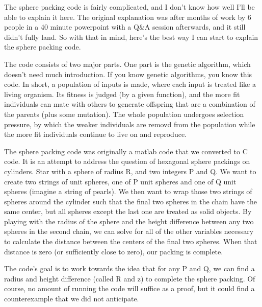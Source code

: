 The sphere packing code is fairly complicated, and I don't know how well I'll be able to explain it here. The original explanation was after months of work by 6 people in a 40 minute powerpoint with a Q\&A session afterwards, and it still didn't fully land. So with that in mind, here's the best way I can start to explain the sphere packing code.

The code consists of two major parts. One part is the genetic algorithm, which doesn't need much introduction. If you know genetic algorithms, you know this code. In short, a population of inputs is made, where each input is treated like a living organism. Its fitness is judged (by a given function), and the more fit individuals can mate with others to generate offspring that are a combination of the parents (plus some mutation). The whole population undergoes selection pressure, by which the weaker individuals are removd from the population while the more fit individuals continue to live on and reproduce.

The sphere packing code was originally a matlab code that we converted to C code. It is an attempt to address the question of hexagonal sphere packings on cylinders.
Star with a sphere of radius R, and two integers P and Q. We want to create two strings of unit spheres, one of P unit spheres and one of Q unit spheres (imagine a string of pearls). We then want to wrap those two strings of spheres around the cylinder such that the final two spheres in the chain have the same center, but all spheres except the last one are treated as solid objects. By playing with the radius of the sphere and the height difference between any two spheres in the second chain, we can solve for all of the other variables necessary to calculate the distance between the centers of the final two spheres. When that distance is zero (or sufficiently close to zero), our packing is complete.

The code's goal is to work towards the idea that for any P and Q, we can find a radius and height difference (called R and z) to complete the sphere packing. Of course, no amount of running the code will suffice as a proof, but it could find a counterexample that we did not anticipate.
